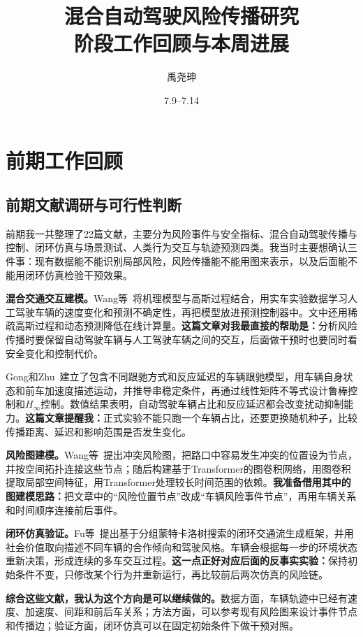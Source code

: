 \documentclass[UTF8,zihao=5,a4paper]{ctexart}
\title{\vspace{-1.2cm}\textbf{混合自动驾驶风险传播研究\\阶段工作回顾与本周进展}}
\author{禹尧珅}
\date{7.9--7.14}
\begin{document}
\pagestyle{plain}
\maketitle
\vspace{-1.8em}

\section{前期工作回顾}

\subsection{前期文献调研与可行性判断}

前期我一共整理了22篇文献，主要分为风险事件与安全指标、混合自动驾驶传播与控制、闭环仿真与场景测试、人类行为交互与轨迹预测四类。我当时主要想确认三件事：现有数据能不能识别局部风险，风险传播能不能用图来表示，以及后面能不能用闭环仿真检验干预效果。

\textbf{混合交通交互建模。}Wang等~\cite{wang2024safety}将机理模型与高斯过程结合，用实车实验数据学习人工驾驶车辆的速度变化和预测不确定性，再把模型放进预测控制器中。文中还用稀疏高斯过程和动态预测降低在线计算量。\textbf{这篇文章对我最直接的帮助是：}分析风险传播时要保留自动驾驶车辆与人工驾驶车辆之间的交互，后面做干预时也要同时看安全变化和控制代价。

Gong和Zhu~\cite{gong2024hinf}建立了包含不同跟驰方式和反应延迟的车辆跟驰模型，用车辆自身状态和前车加速度描述运动，并推导串稳定条件，再通过线性矩阵不等式设计鲁棒控制和$H_{\infty}$控制。数值结果表明，自动驾驶车辆占比和反应延迟都会改变扰动抑制能力。\textbf{这篇文章提醒我：}正式实验不能只跑一个车辆占比，还要更换随机种子，比较传播距离、延迟和影响范围是否发生变化。

\textbf{风险图建模。}Wang等~\cite{wang2024conflict}提出冲突风险图，把路口中容易发生冲突的位置设为节点，并按空间拓扑连接这些节点；随后构建基于Transformer的图卷积网络，用图卷积提取局部空间特征，用Transformer处理较长时间范围的依赖。\textbf{我准备借用其中的图建模思路：}把文章中的“风险位置节点”改成“车辆风险事件节点”，再用车辆关系和时间顺序连接前后事件。

\textbf{闭环仿真验证。}Fu等~\cite{fu2025trafficmcts}提出基于分组蒙特卡洛树搜索的闭环交通流生成框架，并用社会价值取向描述不同车辆的合作倾向和驾驶风格。车辆会根据每一步的环境状态重新决策，形成连续的多车交互过程。\textbf{这一点正好对应后面的反事实实验：}保持初始条件不变，只修改某个行为并重新运行，再比较前后两次仿真的风险链。

\textbf{综合这些文献，我认为这个方向是可以继续做的。}数据方面，车辆轨迹中已经有速度、加速度、间距和前后车关系；方法方面，可以参考现有风险图来设计事件节点和传播边；验证方面，闭环仿真可以在固定初始条件下做干预对照。
\end{document}
